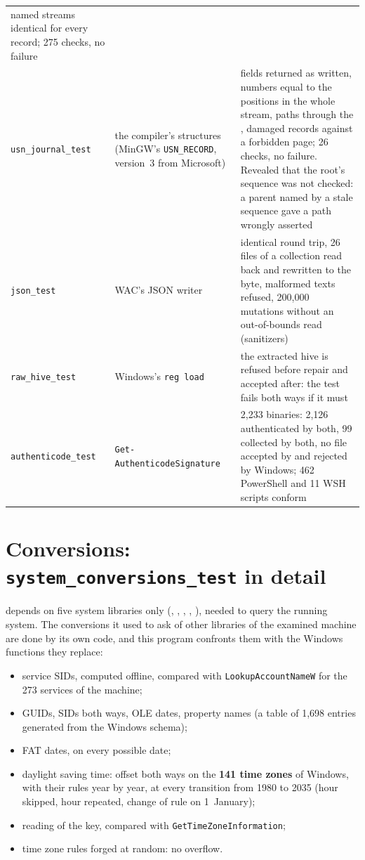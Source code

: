 \documentclass[11pt,a4paper,oneside]{report}
\begin{document}
\begin{longtable}{@{}L{4.6cm}L{3.8cm}L{6.6cm}@{}}
  named streams identical for every record; 275 checks, no failure \\
\texttt{usn\_journal\_test} & the compiler's structures (MinGW's
  \texttt{USN\_RECORD}, version~3 from Microsoft) &
  fields returned as written, numbers equal to the positions in the whole
  stream, paths through the , damaged records against a
  forbidden page; 26 checks, no failure. Revealed that the root's sequence was
  not checked: a parent named by a stale sequence gave a path wrongly
  asserted \\
\texttt{json\_test} & WAC's JSON writer & identical round trip, 26 files of a
  collection read back and rewritten to the byte, malformed texts refused,
  200,000 mutations without an out-of-bounds read (sanitizers) \\
\texttt{raw\_hive\_test} & Windows's \texttt{reg load} &
  the extracted hive is refused before repair and accepted after: the test
  fails both ways if it must \\
\texttt{authenticode\_test} & \texttt{Get-Authenticode}\allowbreak\texttt{Signature} &
  2,233 binaries: 2,126 authenticated by both, 99 collected by both, no file
  accepted by \wac{} and rejected by Windows; 462 PowerShell and 11 WSH
  scripts conform \\
\bottomrule
\end{longtable}

\section{Conversions: \texttt{system\_conversions\_test} in detail}

\wac{} depends on five system libraries only (,
, , , ),
needed to query the running system. The conversions it used to ask of other
libraries of the examined machine are done by its own code, and this program
confronts them with the Windows functions they replace:

\begin{itemize}
  \item service SIDs, computed offline, compared with
    \texttt{LookupAccountNameW} for the 273 services of the machine;
  \item GUIDs, SIDs both ways, OLE dates, property names (a table of 1,698
    entries generated from the Windows schema);
  \item FAT dates, on every possible date;
  \item daylight saving time: offset both ways on the \textbf{141 time zones}
    of Windows, with their rules year by year, at every transition from 1980 to
    2035 (hour skipped, hour repeated, change of rule on 1~January);
  \item reading of the  key, compared with
    \texttt{GetTimeZoneInformation};
  \item time zone rules forged at random: no overflow.
\end{itemize}
\end{document}
